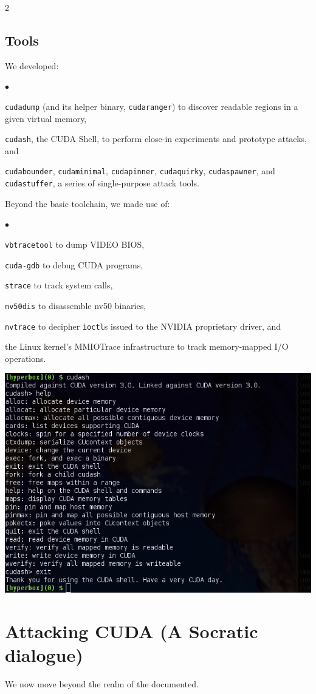 \documentclass[letterpaper,10pt]{article}
\makeatletter
\newcommand{\squishlist}{\begin{list}{$\bullet$}
  {\setlength{\itemsep}{0pt}
    \setlength{\parsep}{3pt}
    \setlength{\topsep}{3pt}
    \setlength{\partopsep}{0pt}
    \setlength{\leftmargin}{1.5em}
    \setlength{\labelwidth}{1em}
    \setlength{\labelsep}{0.5em}
  } }
\newcommand{\squishend}{\end{list}}
\newenvironment{figurehere}
{\def\@captype{figure}}
{}
\makeatother
\begin{document}
\begin{multicols}{2}
\subsection{Tools}
We developed:
\squishlist
\item \texttt{cudadump} (and its helper binary, \texttt{cudaranger}) to
discover readable regions in a given virtual memory,
\item \texttt{cudash}, the CUDA Shell, to perform close-in experiments and
prototype attacks, and
\item \texttt{cudabounder}, \texttt{cudaminimal}, \texttt{cudapinner}, \texttt{cudaquirky},
\texttt{cudaspawner}, and \texttt{cudastuffer}, a series of single-purpose attack tools.
\squishend
Beyond the basic toolchain, we made use of:
\squishlist
\item \texttt{vbtracetool}\cite{vbtrace} to dump VIDEO BIOS,
\item \texttt{cuda-gdb}\cite{cudagdb} to debug CUDA programs,
\item \texttt{strace}\cite{stracecode} to track system calls,
\item \texttt{nv50dis}\cite{nv50dis} to disassemble nv50 binaries,
\item \texttt{nvtrace}\cite{nvtrace} to decipher \texttt{ioctl}s issued to the NVIDIA proprietary driver, and
\item the Linux kernel's MMIOTrace\cite{mmiotrace} infrastructure to track memory-mapped I/O operations.
\squishend
\begin{figurehere}
\centering
\includegraphics[width=\columnwidth]{texobjs/cudash-help.png}
\end{figurehere}
\section{Attacking CUDA (A Socratic dialogue)}
We now move beyond the realm of the documented.

\end{multicols}
\end{document}
